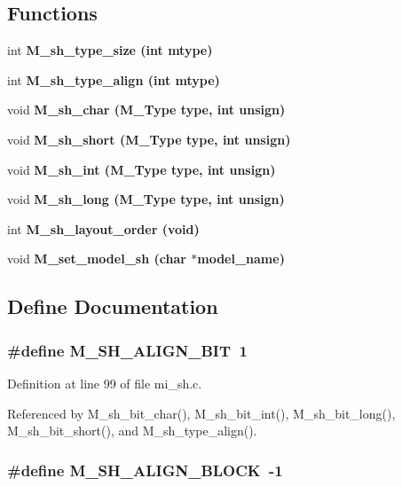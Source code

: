 \subsection*{Functions}
\begin{CompactItemize}
\item 
int \bf{M\_\-sh\_\-type\_\-size} (int mtype)
\item 
int \bf{M\_\-sh\_\-type\_\-align} (int mtype)
\item 
void \bf{M\_\-sh\_\-char} (\bf{M\_\-Type} type, int unsign)
\item 
void \bf{M\_\-sh\_\-short} (\bf{M\_\-Type} type, int unsign)
\item 
void \bf{M\_\-sh\_\-int} (\bf{M\_\-Type} type, int unsign)
\item 
void \bf{M\_\-sh\_\-long} (\bf{M\_\-Type} type, int unsign)
\item 
int \bf{M\_\-sh\_\-layout\_\-order} (void)
\item 
void \bf{M\_\-set\_\-model\_\-sh} (char $\ast$model\_\-name)
\end{CompactItemize}


\subsection{Define Documentation}
\subsubsection{\setlength{\rightskip}{0pt plus 5cm}\#define M\_\-SH\_\-ALIGN\_\-BIT~1}\label{mi__sh_8c_40c1e72de37abc92d2b31c5724c6f68d}




Definition at line 99 of file mi\_\-sh.c.

Referenced by M\_\-sh\_\-bit\_\-char(), M\_\-sh\_\-bit\_\-int(), M\_\-sh\_\-bit\_\-long(), M\_\-sh\_\-bit\_\-short(), and M\_\-sh\_\-type\_\-align().
\subsubsection{\setlength{\rightskip}{0pt plus 5cm}\#define M\_\-SH\_\-ALIGN\_\-BLOCK~-1}\label{mi__sh_8c_220b9e5143c48593bbe9419df625921b}





